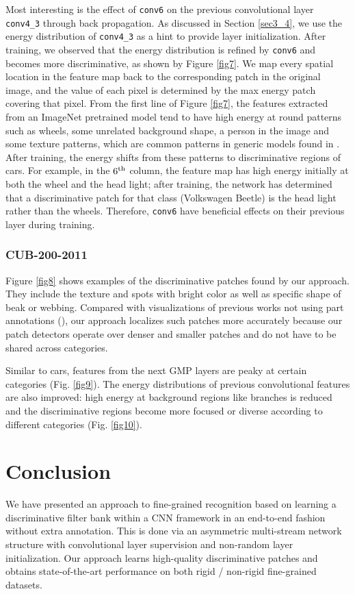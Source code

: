 \documentclass[10pt,twocolumn,letterpaper]{article}
\begin{document}
Most interesting is the effect of \texttt{conv6} on the previous convolutional layer \texttt{conv4\_3} through back
propagation. As discussed in Section \ref{sec3_4},
we use the energy distribution of \texttt{conv4\_3} as a hint to provide layer initialization. After training, we
observed that the energy distribution is refined by \texttt{conv6} and becomes more discriminative, as shown by Figure
\ref{fig7}.
We map every spatial location in the
feature map back to the corresponding patch in the original image, and the value of each pixel is determined by the max
energy patch covering that pixel. From the first line of Figure \ref{fig7}, the features extracted from an ImageNet
pretrained model tend to have high energy at round patterns such as wheels, some unrelated background shape, a person in
the image and some texture patterns, which are common patterns in generic models found in \cite{fergus14}. After
training, the energy shifts from these patterns to discriminative regions of cars. For example, in the $6^{\rm th}$
column, the feature map has high energy initially at both the wheel and the head light; after training, the network
has determined that a discriminative patch for that class (Volkswagen Beetle) is the head light rather than the wheels.
Therefore, \texttt{conv6} have beneficial effects on their previous layer during training.

\subsubsection{CUB-200-2011} \label{sec4_4_3}
Figure \ref{fig8} shows examples of the discriminative patches found by our approach. They include the
texture and spots with bright color as well as specific shape of beak or webbing. Compared with
visualizations of previous works not using part annotations (\eg \cite{krause15, b_cnn}), our approach 
localizes such patches more accurately because our patch detectors operate over denser and smaller
patches and do not have to be shared across categories. 

Similar to cars, features from the next GMP layers are peaky at certain categories (Fig. \ref{fig9}). The energy
distributions of previous convolutional features are also improved: high energy at background regions like 
branches is reduced and the discriminative regions become more focused or diverse according to different categories
(Fig. \ref{fig10}).

\section{Conclusion} \label{sec5}
We have presented an approach to fine-grained recognition based on learning a discriminative filter bank within a CNN
framework in an end-to-end fashion without extra annotation. This is done via an asymmetric multi-stream network
structure with convolutional layer supervision and non-random layer initialization.
Our approach learns high-quality discriminative patches and obtains state-of-the-art performance
on both rigid / non-rigid fine-grained datasets. 

{\small


}
\end{document}
